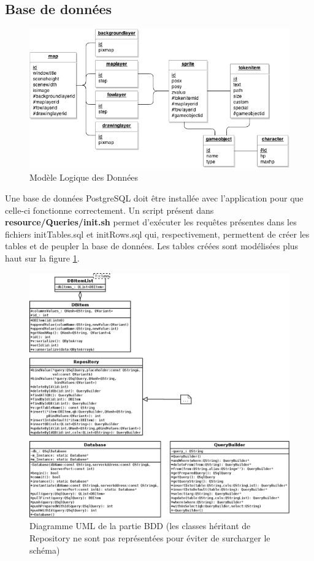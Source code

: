 \subsection {Base de données}

\begin{figure}[h!]
    \centering
    \includegraphics[width=\textwidth]{img/bdd_MLD.png}
    \caption{Modèle Logique des Données}
    \label{fig:bddmld}
\end{figure}

Une base de données PostgreSQL doit être installée avec l'application pour que celle-ci fonctionne correctement. Un script présent dans \textbf{resource/Queries/init.sh} permet d'exécuter les requêtes présentes dans les fichiers initTables.sql et initRows.sql qui, respectivement, permettent de créer les tables et de peupler la base de données. Les tables créées sont modélisées plus haut sur la figure \ref{fig:bddmld}.\\

\begin{figure}[h!]
    \centering
    \includegraphics[width=\textwidth]{img/bdd_uml.png}
    \caption{Diagramme UML de la partie BDD (les classes héritant de Repository ne sont pas représentées pour éviter de surcharger le schéma)}
    \label{fig:bdduml}
\end{figure}

